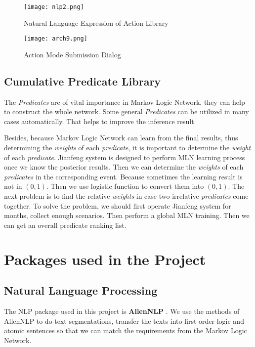 \documentclass[
12pt, %
a4paper, %
oneside, %
headinclude,footinclude, %
BCOR5mm, %
]{scrartcl}
\begin{document}
\begin{figure}[htb]
    \centering 
    \texttt{[image: nlp2.png]} 
    \caption[Natural Language Expression of Action Library]{Natural Language Expression of Action Library} 
    \end{figure}

\begin{figure}[htb]
    \centering 
    \texttt{[image: arch9.png]} 
    \caption[Action Mode Submission Dialog]{Action Mode Submission Dialog} 
    \end{figure}

\subsection{Cumulative Predicate Library} 

The \textit{Predicates} are of vital importance in Markov Logic Network, they can help to construct the whole network. Some general \textit{Predicates} can be utilized in many cases automatically. That helps to improve the inference result. 

Besides, because Markov Logic Network can learn from the final results, thus determining the \textit{weights} of each \textit{predicate}, it is important to determine the \textit{weight} of each \textit{predicate}. Jianfeng system is designed to perform MLN learning process once we know the posterior results. Then we can determine the \textit{weights} of each \textit{predicates} in the corresponding event. Because sometimes the learning result is not in $(0,1)$. Then we use logistic function to convert them into $(0,1)$. The next problem is to find the relative \textit{weights} in case two irrelative \textit{predicates} come together. To solve the problem, we should first operate Jianfeng system for months, collect enough scenarios. Then perform a global MLN training. Then we can get an overall predicate ranking list.


\section{Packages used in the Project}
\subsection{Natural Language Processing}
The NLP package used in this project is \textbf{AllenNLP} \cite{Gardner2017AllenNLP}. We use the methods of AllenNLP to do text segmentations, transfer the texts into first order logic and atomic sentences so that we can match the requirements from the Markov Logic Network.
\end{document}
